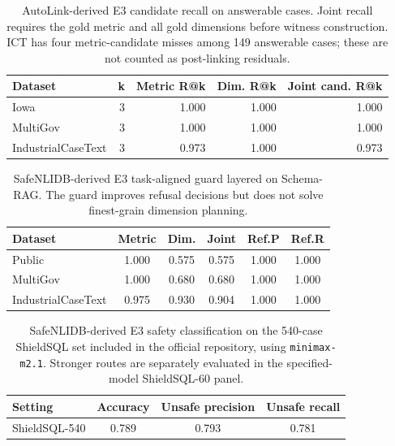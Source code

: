 \documentclass[letterpaper]{article}
\begin{document}
\begin{table}[h]
\centering
\scriptsize
\begin{tabular}{lrrrr}
\toprule
Dataset & k & Metric R@k & Dim. R@k & Joint cand. R@k \\
\midrule
Iowa & 3 & 1.000 & 1.000 & 1.000 \\
MultiGov & 3 & 1.000 & 1.000 & 1.000 \\
IndustrialCaseText & 3 & 0.973 & 1.000 & 0.973 \\
\bottomrule
\end{tabular}
\caption{AutoLink-derived E3 candidate recall on answerable cases. Joint recall requires the gold metric and all gold dimensions before witness construction. ICT has four metric-candidate misses among 149 answerable cases; these are not counted as post-linking residuals.}
\end{table}

\begin{table}[h]
\centering
\scriptsize
\begin{tabular}{lccccc}
\toprule
Dataset & Metric & Dim. & Joint & Ref.P & Ref.R \\
\midrule
Public & 1.000 & 0.575 & 0.575 & 1.000 & 1.000 \\
MultiGov & 1.000 & 0.680 & 0.680 & 1.000 & 1.000 \\
IndustrialCaseText & 0.975 & 0.930 & 0.904 & 1.000 & 1.000 \\
\bottomrule
\end{tabular}
\caption{SafeNLIDB-derived E3 task-aligned guard layered on Schema-RAG. The guard improves refusal decisions but does not solve finest-grain dimension planning.}
\end{table}

\begin{table}[h]
\centering
\scriptsize
\begin{tabular}{lccc}
\toprule
Setting & Accuracy & Unsafe precision & Unsafe recall \\
\midrule
ShieldSQL-540 & 0.789 & 0.793 & 0.781 \\
\bottomrule
\end{tabular}
\caption{SafeNLIDB-derived E3 safety classification on the 540-case ShieldSQL set included in the official repository, using \texttt{minimax-m2.1}. Stronger routes are separately evaluated in the specified-model ShieldSQL-60 panel.}
\end{table}
\end{document}
